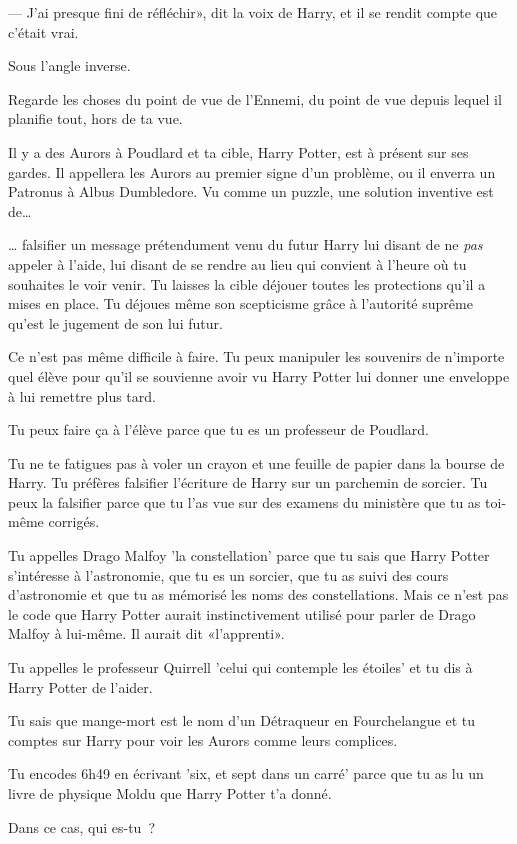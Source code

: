 --- J'ai presque fini de réfléchir», dit la voix de Harry, et il se rendit compte que c'était vrai.

Sous l'angle inverse.

Regarde les choses du point de vue de l'Ennemi, du point de vue depuis lequel il planifie tout, hors de ta vue.

Il y a des Aurors à Poudlard et ta cible, Harry Potter, est à présent sur ses gardes. Il appellera les Aurors au premier signe d'un problème, ou il enverra un Patronus à Albus Dumbledore. Vu comme un puzzle, une solution inventive est de…

… falsifier un message prétendument venu du futur Harry lui disant de ne \emph{pas} appeler à l'aide, lui disant de se rendre au lieu qui convient à l'heure où tu souhaites le voir venir. Tu laisses la cible déjouer toutes les protections qu'il a mises en place. Tu déjoues même son scepticisme grâce à l'autorité suprême qu'est le jugement de son lui futur.

Ce n'est pas même difficile à faire. Tu peux manipuler les souvenirs de n'importe quel élève pour qu'il se souvienne avoir vu Harry Potter lui donner une enveloppe à lui remettre plus tard.

Tu peux faire ça à l'élève parce que tu es un professeur de Poudlard.

Tu ne te fatigues pas à voler un crayon et une feuille de papier dans la bourse de Harry. Tu préfères falsifier l'écriture de Harry sur un parchemin de sorcier. Tu peux la falsifier parce que tu l'as vue sur des examens du ministère que tu as toi-même corrigés.

Tu appelles Drago Malfoy 'la constellation' parce que tu sais que Harry Potter s'intéresse à l'astronomie, que tu es un sorcier, que tu as suivi des cours d'astronomie et que tu as mémorisé les noms des constellations. Mais ce n'est pas le code que Harry Potter aurait instinctivement utilisé pour parler de Drago Malfoy à lui-même. Il aurait dit «l'apprenti».

Tu appelles le professeur Quirrell 'celui qui contemple les étoiles' et tu dis à Harry Potter de l'aider.

Tu sais que mange-mort est le nom d'un Détraqueur en Fourchelangue et tu comptes sur Harry pour voir les Aurors comme leurs complices.

Tu encodes 6h49 en écrivant 'six, et sept dans un carré' parce que tu as lu un livre de physique Moldu que Harry Potter t'a donné.

Dans ce cas, qui es-tu~?

